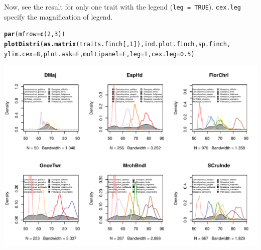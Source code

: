 \documentclass[12pt]{article}\usepackage[]{graphicx}\usepackage[]{color}
\makeatletter
\def\maxwidth{ %
  \ifdim\Gin@nat@width>\linewidth
    \linewidth
  \else
    \Gin@nat@width
  \fi
}
\newcommand{\hlnum}[1]{\textcolor[rgb]{0.686,0.059,0.569}{#1}}%
\newcommand{\hlstd}[1]{\textcolor[rgb]{0.345,0.345,0.345}{#1}}%
\newcommand{\hlkwc}[1]{\textcolor[rgb]{0.333,0.667,0.333}{#1}}%
\newcommand{\hlkwd}[1]{\textcolor[rgb]{0.737,0.353,0.396}{\textbf{#1}}}%
\newenvironment{kframe}{%
 \def\at@end@of@kframe{}%
 \ifinner\ifhmode%
  \def\at@end@of@kframe{\end{minipage}}%
  \begin{minipage}{\columnwidth}%
 \fi\fi%
 \def\FrameCommand##1{\hskip\@totalleftmargin \hskip-\fboxsep
 \colorbox{shadecolor}{##1}\hskip-\fboxsep
     \hskip-\linewidth \hskip-\@totalleftmargin \hskip\columnwidth}%
 \MakeFramed {\advance\hsize-\width
   \@totalleftmargin\z@ \linewidth\hsize
   \@setminipage}}%
 {\par\unskip\endMakeFramed%
 \at@end@of@kframe}
\newenvironment{knitrout}{}{} %
\makeatother
\begin{document}
\begin{knitrout}
\end{knitrout}

Now, see the result for only one trait with the legend (\texttt{leg = TRUE}). \texttt{cex.leg} specify the magnification of legend. 

\begin{knitrout}
\color{fgcolor}\begin{kframe}
\begin{alltt}
\hlkwd{par}\hlstd{(}\hlkwc{mfrow} \hlstd{=} \hlkwd{c}\hlstd{(}\hlnum{2}\hlstd{,}\hlnum{3}\hlstd{))}
\hlkwd{plotDistri}\hlstd{(}\hlkwd{as.matrix}\hlstd{(traits.finch[,}\hlnum{1}\hlstd{]), ind.plot.finch, sp.finch,}
     \hlkwc{ylim.cex} \hlstd{=} \hlnum{8}\hlstd{,} \hlkwc{plot.ask} \hlstd{= F,} \hlkwc{multipanel} \hlstd{= F,} \hlkwc{leg} \hlstd{= T,} \hlkwc{cex.leg} \hlstd{=} \hlnum{0.5}\hlstd{)}
\end{alltt}
\end{kframe}
\includegraphics[width=\maxwidth]{figure/unnamed-chunk-12} 

\end{knitrout}
\end{document}
